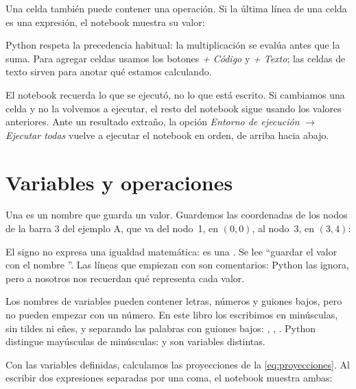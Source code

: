 Una celda también puede contener una operación. Si la última línea de una
celda es una expresión, el notebook muestra su valor:

Python respeta la precedencia habitual: la multiplicación se evalúa antes que
la suma. Para agregar celdas usamos los botones \emph{+ Código} y
\emph{+ Texto}; las celdas de texto sirven para anotar qué estamos calculando.

\begin{cuidado}
El notebook recuerda lo que se ejecutó, no lo que está escrito. Si cambiamos
una celda y no la volvemos a ejecutar, el resto del notebook sigue usando los
valores anteriores. Ante un resultado extraño, la opción \emph{Entorno de
ejecución} $\to$ \emph{Ejecutar todas} vuelve a ejecutar el notebook en orden,
de arriba hacia abajo.
\end{cuidado}

\section{Variables y operaciones}\label{sec:variables}

Una  es un nombre que guarda un valor. Guardemos
las coordenadas de los nodos de la barra 3 del ejemplo A, que va del nodo~1,
en $(0, 0)$, al nodo~3, en $(3, 4)$:

El signo \py{=} no expresa una igualdad matemática: es una
. Se lee \enquote{guardar el valor
 con el nombre }. Las líneas que empiezan con \py{#} son
comentarios: Python las ignora, pero a nosotros nos recuerdan qué representa
cada valor.

\begin{python}
Los nombres de variables pueden contener letras, números y guiones bajos, pero
no pueden empezar con un número. En este libro los escribimos en minúsculas,
sin tildes ni eñes, y separando las palabras con guiones bajos:
, , . Python distingue mayúsculas de
minúsculas:  y  son variables distintas.
\end{python}

Con las variables definidas, calculamos las proyecciones de la
\cref{eq:proyecciones}. Al escribir dos expresiones separadas por una coma, el
notebook muestra ambas:

